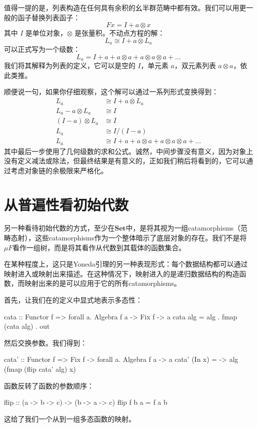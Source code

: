 \documentclass[DaoFP]{subfiles}
\begin{document}
值得一提的是，列表构造在任何具有余积的幺半群范畴中都有效。我们可以用更一般的函子替换列表函子：
\[ F x = I + a \otimes x \]
其中 $I$ 是单位对象，$\otimes$ 是张量积。不动点方程的解：
\[ L_a \cong I + a \otimes L_a \]
可以正式写为一个级数：
\[ L_a = I + a + a \otimes a + a \otimes a \otimes a + ... \]
我们将其解释为列表的定义，它可以是空的 $I$，单元素 $a$，双元素列表 $a \otimes a$，依此类推。

顺便说一句，如果你仔细观察，这个解可以通过一系列形式变换得到：
\begin{align*}
L_a &\cong I + a \otimes L_a
\\
L_a - a \otimes L_a &\cong I
\\
(I - a) \otimes L_a &\cong I
\\
L_a &\cong I / (I - a)
\\
L_a &\cong I + a + a \otimes a + a \otimes a \otimes a + ...
\end{align*}
其中最后一步使用了几何级数的求和公式。诚然，中间步骤没有意义，因为对象上没有定义减法或除法，但最终结果是有意义的，正如我们稍后将看到的，它可以通过考虑对象链的余极限来严格化。

\section{从普遍性看初始代数}

另一种看待初始代数的方式，至少在$\mathbf{Set}$中，是将其视为一组catamorphisms（范畴态射），这些catamorphisms作为一个整体暗示了底层对象的存在。我们不是将$\mu F$看作一组树，而是将其看作从代数到其载体的函数集合。

在某种程度上，这只是Yoneda引理的另一种表现形式：每个数据结构都可以通过映射进入或映射出来描述。在这种情况下，映射进入的是递归数据结构的构造函数，而映射出来的是可以应用于它的所有catamorphisms。

首先，让我们在的定义中显式地表示多态性：
\begin{haskell}
cata :: Functor f => forall a. Algebra f a -> Fix f -> a
cata alg = alg . fmap (cata alg) . out
\end{haskell}
然后交换参数。我们得到：
\begin{haskell}
cata' :: Functor f => Fix f -> forall a. Algebra f a -> a
cata' (In x) = \alg -> alg (fmap (flip cata' alg) x)
\end{haskell}
函数反转了函数的参数顺序：
\begin{haskell}
flip :: (a -> b -> c) -> (b -> a -> c)
flip f b a = f a b
\end{haskell}
这给了我们一个从到一组多态函数的映射。
\end{document}
